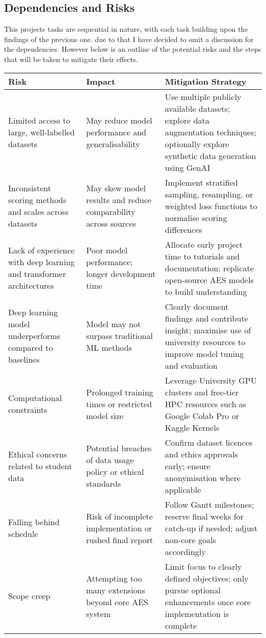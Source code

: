 \documentclass[11pt]{article}
\begin{document}
\pagebreak
\subsection*{Dependencies and Risks}

This projects tasks are sequential in nature, with each task building upon the findings of the previous one. due to that I have decided to omit a discussion for the dependencies. However 
below is an outline of the potential risks and the steps that will be taken to mitigate their effects.


\begin{center}
    \renewcommand{\arraystretch}{1.4}
    \begin{tabular}{|p{4.5cm}|p{6cm}|p{4.5cm}|}
        \hline
        \textbf{Risk} & \textbf{Impact} & \textbf{Mitigation Strategy} \\
        \hline
        Limited access to large, well-labelled datasets & May reduce model performance and generalisability & Use multiple publicly available datasets; explore data augmentation techniques; optionally 
        explore synthetic data generation using GenAI \\
        \hline
        Inconsistent scoring methods and scales across datasets & May skew model results and reduce comparability across sources & Implement stratified sampling, resampling, or weighted loss functions 
        to normalise scoring differences \\
        \hline
        Lack of experience with deep learning and transformer architectures & Poor model performance; longer development time & Allocate early project time to tutorials and documentation; replicate 
        open-source AES models to build understanding \\
        \hline
        Deep learning model underperforms compared to baselines & Model may not surpass traditional ML methods & Clearly document findings and contribute insight; maximise use of university resources 
        to improve model tuning and evaluation \\
        \hline
        Computational constraints & Prolonged training times or restricted model size & Leverage University GPU clusters and free-tier HPC resources such as Google Colab Pro or Kaggle Kernels \\
        \hline
        Ethical concerns related to student data & Potential breaches of data usage policy or ethical standards & Confirm dataset licences and ethics approvals early; ensure anonymisation where applicable \\
        \hline
        Falling behind schedule & Risk of incomplete implementation or rushed final report & Follow Gantt milestones; reserve final weeks for catch-up if needed; adjust non-core goals accordingly \\
        \hline
        Scope creep & Attempting too many extensions beyond core AES system & Limit focus to clearly defined objectives; only pursue optional enhancements once core implementation is complete \\
        \hline
    \end{tabular}
    \end{center}
\end{document}
